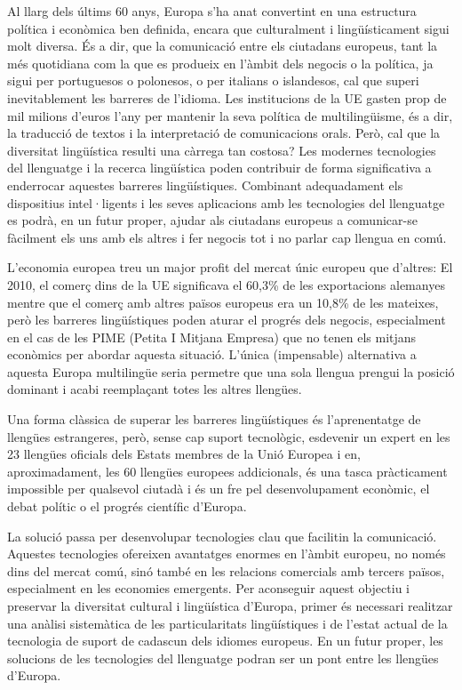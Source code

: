 \begin{multicols}{2}

Al llarg dels últims 60 anys, Europa s'ha anat convertint en una estructura política i econòmica ben definida, encara que culturalment i lingüísticament sigui molt diversa. És a dir, que la comunicació entre els ciutadans europeus,
tant la més quotidiana com la que es produeix en l'àmbit dels negocis o la política, ja sigui per portuguesos o polonesos, o per italians o islandesos, cal que superi inevitablement les barreres de l'idioma. Les institucions de la UE gasten prop de mil milions d'euros l'any per mantenir la seva política de multilingüisme, és a dir, la traducció de textos i la interpretació de comunicacions orals. Però, cal que la diversitat lingüística resulti una càrrega tan costosa? Les modernes tecnologies del llenguatge i la recerca lingüística poden contribuir de forma significativa a enderrocar aquestes barreres lingüístiques. Combinant adequadament els dispositius intel·ligents i les seves aplicacions amb les tecnologies del llenguatge es podrà, en un futur proper, ajudar als ciutadans europeus a comunicar-se fàcilment els uns amb els altres i fer negocis tot i no parlar cap llengua en comú.


L'economia europea treu un major profit del mercat únic europeu que d'altres: El 2010, el comerç dins de la UE significava el 60,3\% de les exportacions alemanyes mentre que el comerç amb altres països europeus era un 10,8\% de les mateixes, però les barreres lingüístiques poden aturar el progrés dels negocis, especialment en el cas de les PIME (Petita I Mitjana Empresa) que no tenen els mitjans econòmics per abordar aquesta situació. L'única (impensable) alternativa a aquesta Europa multilingüe seria permetre que una sola llengua prengui la posició dominant i acabi reemplaçant totes les altres llengües.

Una forma clàssica de superar les barreres lingüístiques és l'aprenentatge de llengües estrangeres, però, sense cap suport tecnològic, esdevenir un expert en les 23 llengües oficials dels Estats membres de la Unió Europea i en, aproximadament, les 60 llengües europees addicionals, és una tasca pràcticament impossible per qualsevol ciutadà i és un fre pel desenvolupament econòmic, el debat polític o el progrés científic d’Europa.

La solució passa per desenvolupar tecnologies clau que facilitin la comunicació. Aquestes tecnologies ofereixen avantatges enormes  en l'àmbit europeu, no només dins del mercat comú, sinó també en les relacions comercials amb tercers països, especialment en les economies emergents. Per aconseguir aquest objectiu i preservar la diversitat cultural i lingüística d'Europa, primer és necessari realitzar una anàlisi sistemàtica de les particularitats lingüístiques i de l'estat actual de la tecnologia de suport de cadascun dels idiomes europeus. En un futur proper, les solucions de les tecnologies del llenguatge podran ser un pont entre les llengües d'Europa.


\end{multicols}
